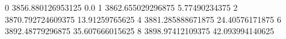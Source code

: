 0 3856.880126953125 0.0
1 3862.655029296875 5.77490234375
2 3870.792724609375 13.91259765625
4 3881.285888671875 24.40576171875
6 3892.48779296875 35.607666015625
8 3898.97412109375 42.093994140625
